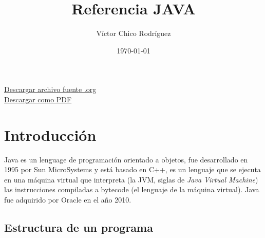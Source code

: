 \documentclass[11pt]{article}
\author{Víctor Chico Rodríguez}
\date{\today}
\title{Referencia JAVA}
\begin{document}
\maketitle
\tableofcontents

\href{./referenciajava.org}{Descargar archivo fuente .org}\\
\href{./referenciajava.pdf}{Descargar como PDF}

\section{Introducción}
\label{sec:orgfc853dc}
Java es un lenguage de programación orientado a objetos, fue desarrollado en 1995 por Sun MicroSystems y está basado en C++, es un lenguaje que se ejecuta en una máquina virtual que interpreta (la JVM, siglas de \emph{Java Virtual Machine}) las instrucciones compiladas a bytecode (el lenguaje de la máquina virtual). Java fue adquirido por Oracle en el año 2010.
\subsection{Estructura de un programa}
\label{sec:org3e9d3c6}
\end{document}
